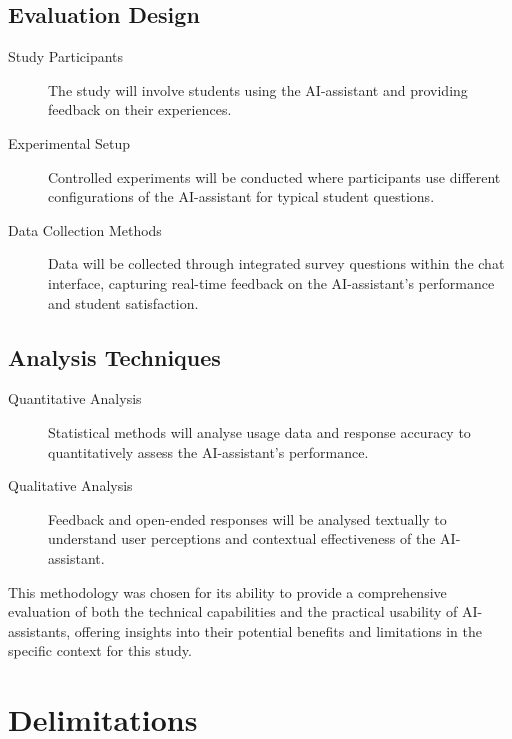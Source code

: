 \subsection{Evaluation Design}
\begin{description}
        \item[Study Participants] The study will involve students using the AI-assistant and providing feedback on their experiences.


\item[Experimental Setup] Controlled experiments will be conducted where participants use different configurations of the AI-assistant for typical student questions.


\item[Data Collection Methods] Data will be collected through integrated survey questions within the chat interface, capturing real-time feedback on the AI-assistant’s performance and student satisfaction.
\end{description}


\subsection{Analysis Techniques}
\begin{description}
        \item[Quantitative Analysis] Statistical methods will analyse usage data and response accuracy to quantitatively assess the AI-assistant's performance.
        \item[Qualitative Analysis] Feedback and open-ended responses will be analysed textually to understand user perceptions and contextual effectiveness of the AI-assistant.
\end{description}


This methodology was chosen for its ability to provide a comprehensive evaluation of both the technical capabilities and the practical usability of AI-assistants, offering insights into their potential benefits and limitations in the specific context for this study.




\section{Delimitations}
\label{sec:delimitations}




